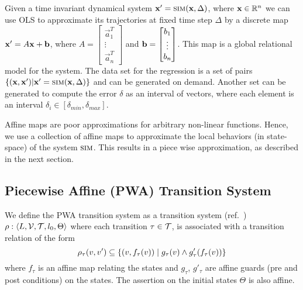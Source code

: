 Given a time invariant dynamical system $\mathbf{x}' = \mbox{\sc sim}(\mathbf{x}, \Delta)$,
where $\mathbf{x}\in\mathbb{R}^n$ we can use OLS to approximate its trajectories
at fixed time step $\Delta$ by a discrete map $\mathbf{x}' = A\mathbf{x} + \mathbf{b}$, where
$A = \begin{bmatrix}\vec{a}_1^T \\ \vdots \\ \vec{a}_n^T \end{bmatrix}$ and $\mathbf{b} =
\begin{bmatrix}b_1 \\ \vdots \\ b_n \end{bmatrix}$. This map is a
    global relational model for the system. The data set for the
    regression is a set of pairs $\{(\mathbf{x},\mathbf{x}') | \mathbf{x}' =
    \mbox{\sc sim}(\mathbf{x}, \Delta)\}$ and can be generated on demand. Another
    set can be generated to compute the error $\delta$ as an interval
    of vectors, where each element is an interval $\delta_i \in
    [\delta_{min}, \delta_{max}]$.
    
    Affine maps are poor
    approximations for arbitrary non-linear functions. Hence, we use a
    collection of affine maps to approximate the local behaviors (in
    state-space) of the system $\mbox{\sc sim}$. This results in a piece
    wise approximation, as described in the next section.

\subsection{Piecewise Affine (PWA) Transition System}

We define the PWA transition system as a transition system
(ref.~) $\rho:\left\langle L,\mathcal{V},\mathcal{T}, l_0,\Theta \right \rangle$
where each transition $\tau \in \mathcal{T}$, is associated with a
transition relation of the form
\[
    \rho_{\tau}(v,v') \subseteq \{(v,f_{\tau}(v)) \;|\; g_\tau(v) \land g'_\tau(f_{\tau}(v))\}
\]
where $f_{\tau}$ is an affine map relating the states and $g_{\tau}$,
$g'_{\tau}$ are affine guards (pre and post conditions) on the states.
The assertion on the initial states $\Theta$ is also affine.

